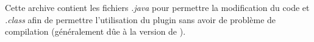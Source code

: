 Cette archive contient les fichiers \emph{.java} pour permettre la modification du code et \emph{.class} afin de permettre l'utilisation du plugin sans avoir de problème de compilation (généralement dûe à la version de \java ). 
%

%
%
%
%
